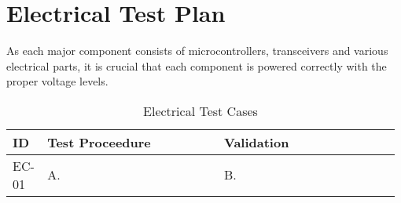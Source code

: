 

\setcounter{section}{3}
\section{Electrical Test Plan}
\bigskip


As each major component consists of microcontrollers, transceivers and various electrical parts, it is crucial that each component is powered correctly with the proper voltage levels.


\bigskip
\bgroup
\def\arraystretch{1.25}
\begin{table}[h!]
    \centering
    \begin{tabular}{|p{0.075\linewidth}|p{0.45\linewidth}|p{0.45\linewidth}|} 
    \hline
    ID & Test Proceedure & Validation\\ 

    \hline
    EC-01
    & A.  
    & B. \\ 
    \hline    





    \hline
    \end{tabular}
    \caption{Electrical Test Cases}
\end{table}